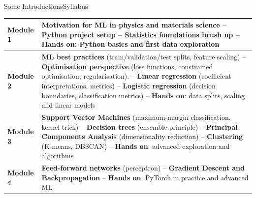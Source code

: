 \begin{frame}{Some Introductions}{Syllabus}
    \vfill
    \begin{tabular}{@{}lp{35em}@{}}
        \textbf{Module 1} & \textbf{Motivation} for ML in physics and materials science -- \textbf{Python} project setup -- \textbf{Statistics foundations} brush up -- \textbf{Hands on}: Python basics and first data exploration                                                                                                                                                                                      \\ \hline
        \textbf{Module 2} & \textbf{ML best practices} (train/validation/test splits, feature scaling) -- \textbf{Optimisation perspective} (loss functions, constrained optimisation, regularisation). -- \textbf{Linear regression} (coefficient interpretations, metrics) -- \textbf{Logistic regression} (decision boundaries, classification metrics) -- \textbf{Hands on}: data splits, scaling, and linear models \\ \hline
        \textbf{Module 3} & \textbf{Support Vector Machines} (maximum-margin classification, kernel trick) -- \textbf{Decision trees} (ensemble principle) -- \textbf{Principal Components Analysis} (dimensionality reduction) -- \textbf{Clustering} (K-means, DBSCAN) -- \textbf{Hands on}: advanced exploration and algorithms                                                                                       \\ \hline
        \textbf{Module 4} & \textbf{Feed-forward networks} (perceptron) -- \textbf{Gradient Descent and Backpropagation} -- \textbf{Hands on}: PyTorch in practice and advanced ML
    \end{tabular}
    \vfill
\end{frame}

